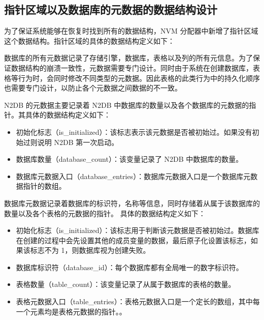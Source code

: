 \subsection{指针区域以及数据库的元数据的数据结构设计}
\label{ssec:data-structure-recovery}

为了保证系统能够在恢复时找到所有的数据结构，NVM 分配器中新增了指针区域这个数据结构。指针区域的具体的数据结构定义如下：


数据库的所有元数据记录了存储引擎，数据库，表格以及列的所有元信息。为了保证数据结构的崩溃一致性，元数据需要专门设计。同时由于系统在创建数据库，表格等行为时，会同时修改不同类型的元数据。因此表格的此类行为中的持久化顺序也需要专门设计，以防止各个元数据之间数据的不一致。

N2DB 的元数据主要记录着 N2DB 中数据库的数量以及各个数据库的元数据的指针。其具体的数据结构定义如下：
\begin{itemize}
    \item 初始化标志（is\_initialized）：该标志表示该元数据是否被初始过。如果没有初始过则说明 N2DB 第一次启动。
    \item 数据库数量（database\_count）：该变量记录了 N2DB 中数据库的数量。
    \item 数据库元数据入口（database\_entries）：数据库元数据入口是一个数据库元数据指针的数组。
\end{itemize}

数据库元数据记录着数据库的标识符，名称等信息，同时存储着从属于该数据库的数量以及各个表格的元数据的指针。
具体的数据结构定义如下：
\begin{itemize}
    \item 初始化标志（is\_initialized）：该标志用于判断该元数据是否被初始过。数据库在创建的过程中会先设置其他的成员变量的数据，最后原子化设置该标志，如果该标志不为 1，则数据库视为创建失败。
    \item 数据库标识符（database\_id）：每个数据库都有全局唯一的数字标识符。
    \item 表格数量（table\_count）：该变量记录了从属于数据库的表格的数量。
    \item 表格元数据入口（table\_entries）：表格元数据入口是一个定长的数组，其中每一个元素均是表格元数据的指针。。
\end{itemize}

